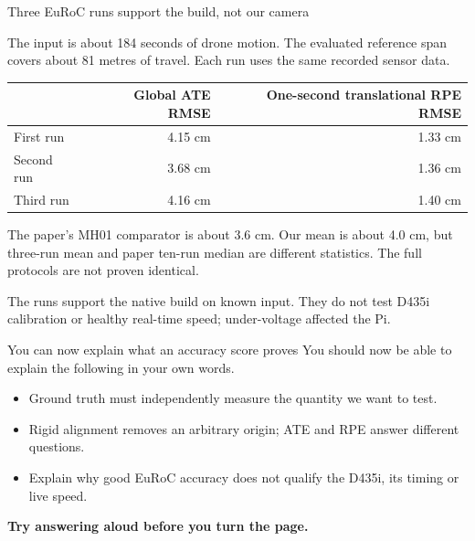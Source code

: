 \documentclass[aspectratio=169,12pt,t]{beamer}
\newcommand{\para}[1]{#1\par\medskip}
\newcommand{\lesson}[1]{\vfill{\color{teal!70!black}\bfseries #1}\par}
\begin{document}
\begin{frame}{Three EuRoC runs support the build, not our camera}

\para{The input is about 184 seconds of drone motion. The evaluated reference span covers about 81 metres of travel. Each run uses the same recorded sensor data.}
\begin{center}\begin{tabular}{lrr}\toprule
 & Global ATE RMSE & One-second translational RPE RMSE\\\midrule
First run & 4.15 cm & 1.33 cm\\
Second run & 3.68 cm & 1.36 cm\\
Third run & 4.16 cm & 1.40 cm\\\bottomrule
\end{tabular}\end{center}
\para{The paper's MH01 comparator is about 3.6 cm. Our mean is about 4.0 cm, but three-run mean and paper ten-run median are different statistics. The full protocols are not proven identical.}
\para{The runs support the native build on known input. They do not test D435i calibration or healthy real-time speed; under-voltage affected the Pi.}

\end{frame}

\begin{frame}{You can now explain what an accuracy score proves}
\para{You should now be able to explain the following in your own words.}
\begin{itemize}
\item Ground truth must independently measure the quantity we want to test.
\item Rigid alignment removes an arbitrary origin; ATE and RPE answer different questions.
\item Explain why good EuRoC accuracy does not qualify the D435i, its timing or live speed.
\end{itemize}
\lesson{Try answering aloud before you turn the page.}
\end{frame}
\end{document}
